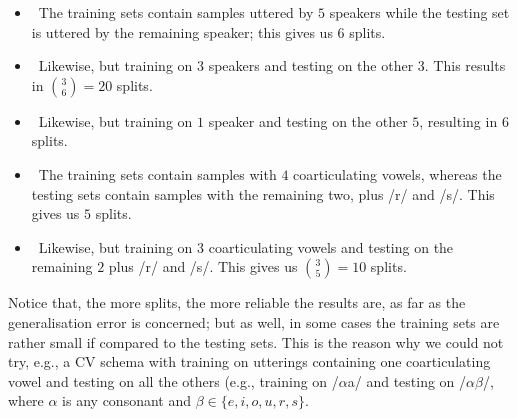 \begin{itemize}

  \item \spka\ The training sets contain samples
  	uttered by $5$ speakers while the testing set is
  	uttered by the remaining speaker; this gives us $6$ splits.

  \item \spkb\ Likewise, but training on $3$ speakers and testing on the
  	other $3$. This results in $\binom{3}{6} = 20$ splits.

  \item \spkc\ Likewise, but training on $1$ speaker and testing on the
  	other $5$, resulting in $6$ splits.

  \item \coa\ The training sets contain samples
  	with $4$ coarticulating vowels, whereas the testing sets contain samples
  	with the remaining two, plus /r/ and /s/. This gives us $5$ splits.

  \item \cob\ Likewise, but training on $3$ coarticulating vowels and
  	testing on the remaining $2$ plus /r/ and /s/. This gives us
  	$\binom{3}{5} = 10$ splits.

\end{itemize}

Notice that, the more splits, the more reliable the results are, as far as the
generalisation error is concerned; but as well, in some cases the training sets
are rather small if compared to the testing sets. This is the reason why we could
not try, e.g., a CV schema with training on utterings containing
one coarticulating vowel and testing on all the others (e.g., training on
/$\alpha$a/ and testing on /$\alpha\beta$/, where $\alpha$ is any consonant
and $\beta \in \{e,i,o,u,r,s\}$.
